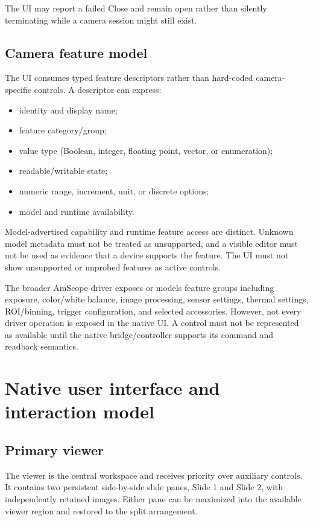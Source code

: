 \documentclass[11pt,a4paper,oneside]{article}
\begin{document}
The UI may report a failed Close and remain open rather than silently terminating while a camera session might still exist.

\subsection{Camera feature model}
The UI consumes typed feature descriptors rather than hard-coded camera-specific controls. A descriptor can express:
\begin{itemize}
  \item identity and display name;
  \item feature category/group;
  \item value type (Boolean, integer, floating point, vector, or enumeration);
  \item readable/writable state;
  \item numeric range, increment, unit, or discrete options;
  \item model and runtime availability.
\end{itemize}

Model-advertised capability and runtime feature access are distinct. Unknown model metadata must not be treated as unsupported, and a visible editor must not be used as evidence that a device supports the feature. The UI must not show unsupported or unprobed features as active controls.

The broader AmScope driver exposes or models feature groups including exposure, color/white balance, image processing, sensor settings, thermal settings, ROI/binning, trigger configuration, and selected accessories. However, not every driver operation is exposed in the native UI. A control must not be represented as available until the native bridge/controller supports its command and readback semantics.

\section{Native user interface and interaction model}

\subsection{Primary viewer}
The viewer is the central workspace and receives priority over auxiliary controls. It contains two persistent side-by-side slide panes, Slide 1 and Slide 2, with independently retained images. Either pane can be maximized into the available viewer region and restored to the split arrangement.
\end{document}
